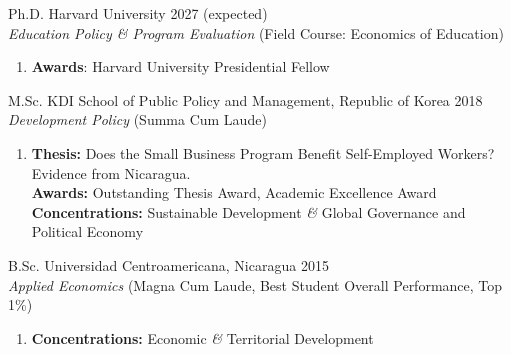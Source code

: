 \documentclass[a4paper, 10pt]{article}
\renewenvironment{itemize}{
  \begin{list}{}
    { \setlength{\itemsep}{5pt}
      \setlength{\parsep}{0pt}
      \setlength{\topsep}{0pt}
      \setlength{\leftmargin}{0em} } }{
  \end{list}}
\begin{document}
\begin{itemize}
\item Ph.D. Harvard University \hfill 2027 (expected) \\
{\small \textit{Education Policy \& Program Evaluation} (Field Course: Economics
of Education)}
  \begin{enumerate}[leftmargin=10pt, label={}, nosep]
    \item {\small \textbf{Awards}: Harvard University Presidential Fellow }
  \end{enumerate}

\item M.Sc. KDI School of Public Policy and Management, Republic of Korea \hfill 2018 \\
{\small \textit{Development Policy} (Summa Cum Laude)}
  
  \begin{enumerate}[leftmargin=10pt, label={}, nosep]
    \item {\small \textbf{Thesis:} Does the Small Business Program Benefit Self-Employed Workers? Evidence from Nicaragua. \\ 
    \textbf{Awards:} Outstanding Thesis Award, Academic Excellence Award \\ 
    \textbf{Concentrations:} Sustainable Development \textit{\&} Global Governance and Political Economy }
  \end{enumerate}
\item B.Sc. Universidad Centroamericana, Nicaragua \hfill 2015 \\
{\small \textit{Applied Economics} (Magna Cum Laude, Best Student Overall Performance, Top 1\%)}
  
  \begin{enumerate}[leftmargin=10pt, label={}, nosep]
    \item {\small \textbf{Concentrations:} Economic \textit{\&} Territorial Development}
  \end{enumerate}
\end{itemize}
\end{document}
